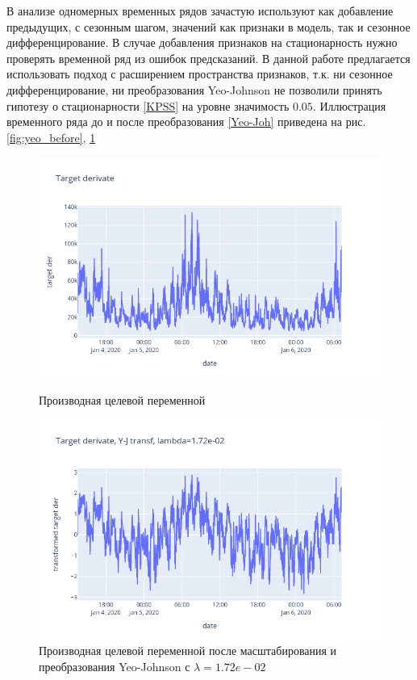 \documentclass[14pt, a4paper]{extarticle}
\begin{document}
	В анализе одномерных временных рядов зачастую используют как добавление предыдущих, с сезонным шагом, значений как признаки в модель, так и сезонное дифференцирование. 
	В случае добавления признаков на стационарность нужно проверять временной ряд из ошибок предсказаний.
	В данной работе предлагается использовать подход с расширением пространства признаков, т.к. ни сезонное дифференцирование, ни преобразования Yeo-Johnson не позволили принять гипотезу о стационарности \ref{KPSS} на уровне значимость $0.05$.
	Иллюстрация временного ряда до и после преобразования \ref{Yeo-Joh} приведена на рис.\ref{fig:yeo_before}, \ref{fig:yeo_after}
	\begin{figure}[!htb]
		\includegraphics[width=\linewidth]{Figures/Y-J_before.png}
		\caption{Производная целевой переменной}\label{fig:yeo_before}
		\endminipage\hfill
		\includegraphics[width=\linewidth]{Figures/Y-J_after.png}
		\caption{Производная целевой переменной после масштабирования и преобразования Yeo-Johnson с $\lambda=1.72e-02$}\label{fig:yeo_after}
		\endminipage
	\end{figure}
	
\end{document}
